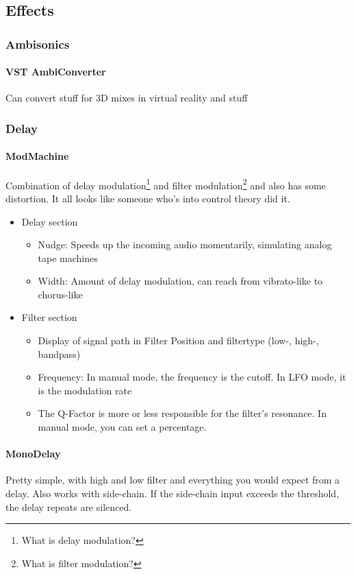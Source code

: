 \documentclass[10pt]{article}
\begin{document}
\subsection{Effects}

\subsubsection{Ambisonics}

\paragraph{VST AmbiConverter} Can convert stuff for 3D mixes in virtual reality and stuff

\subsubsection{Delay}

\paragraph{ModMachine} Combination of delay modulation\footnote{What is delay modulation?} and filter modulation\footnote{What is filter modulation?} and also has some distortion. It all looks like someone who's into control theory did it.

\begin{itemize}
	\item Delay section
	\begin{itemize}
		\item Nudge: Speeds up the incoming audio momentarily, simulating analog tape machines
		\item Width: Amount of delay modulation, can reach from vibrato-like to chorus-like
	\end{itemize}
	\item Filter section
	\begin{itemize}
		\item Display of signal path in Filter Position and filtertype (low-, high-, bandpass)
		\item Frequency: In manual mode, the frequency is the cutoff. In LFO mode, it is the modulation rate
		\item The Q-Factor is more or less responsible for the filter's resonance. In manual mode, you can set a percentage.
	\end{itemize}
\end{itemize}

\paragraph{MonoDelay} Pretty simple, with high and low filter and everything you would expect from a delay.
Also works with side-chain. If the side-chain input exceeds the threshold, the delay repeats are silenced.
\end{document}
